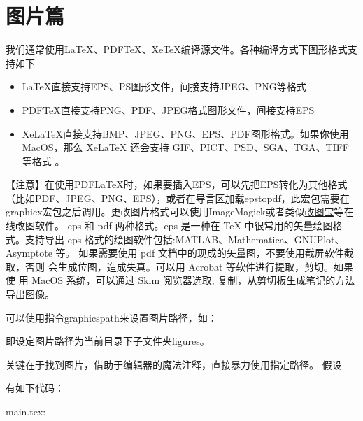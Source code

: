 
\section{图片篇}



我们通常使用LaTeX、PDFTeX、XeTeX编译源文件。各种编译方式下图形格式支持如下
\begin{itemize}
    \item LaTeX直接支持EPS、PS图形文件，间接支持JPEG、PNG等格式
    \item PDFTeX直接支持PNG、PDF、JPEG格式图形文件，间接支持EPS
    \item XeLaTeX直接支持BMP、JPEG、PNG、EPS、PDF图形格式。如果你使用MacOS，那么
    XeLaTeX 还会支持 GIF、PICT、PSD、SGA、TGA、TIFF 等格式 。
\end{itemize}

【注意】在使用PDFLaTeX时，如果要插入EPS，可以先把EPS转化为其他格式（比如PDF、JPEG、PNG、EPS），或者在导言区加载epstopdf，此宏包需要在graphicx宏包之后调用。更改图片格式可以使用ImageMagick或者类似\href{http://www.gaitubao.com}{改图宝}等在线改图软件。
eps 和 pdf 两种格式。eps 是一种在 TeX 中很常用的矢量绘图格式。支持导出
eps 格式的绘图软件包括:MATLAB、Mathematica、GNUPlot、 Asymptote 等。
如果需要使用 pdf 文档中的现成的矢量图，不要使用截屏软件截取，否则
会生成位图，造成失真。可以用 Acrobat 等软件进行提取，剪切。如果使 用
MacOS 系统，可以通过 Skim 阅览器选取,
复制，从剪切板生成笔记的方法导出图像。


可以使用指令graphicspath来设置图片路径，如：
\begin{texinlist}
\graphicspath{{./figures/}}
\end{texinlist}

即设定图片路径为当前目录下子文件夹figures。



关键在于找到图片，借助于编辑器的魔法注释，直接暴力使用指定路径。
假设
\begingroup
\endgroup

有如下代码：

main.tex:

